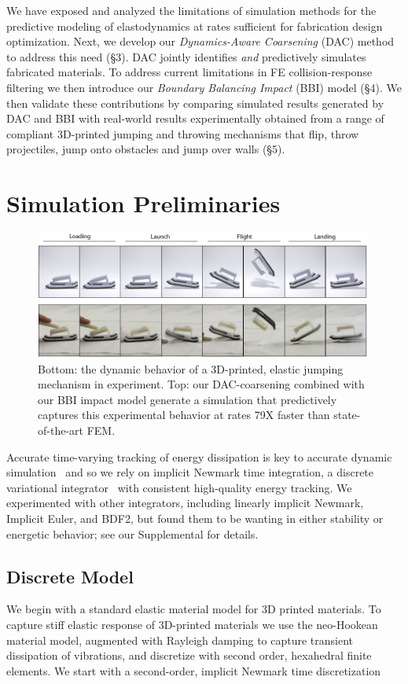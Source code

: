 We have exposed and analyzed the limitations of simulation methods for the predictive modeling of elastodynamics at rates sufficient for fabrication design optimization. Next, we develop our \emph{Dynamics-Aware Coarsening} (DAC) method to address this need {(\S3)}. DAC jointly identifies \emph{and} predictively simulates fabricated materials. To address current limitations in FE collision-response filtering we then introduce our \emph{Boundary Balancing Impact} (BBI) model {(\S4)}. 
We then validate these contributions by comparing simulated results generated by DAC and BBI with real-world results experimentally obtained from a range of compliant 3D-printed jumping and throwing mechanisms that flip, throw projectiles, jump onto obstacles and jump over walls (\S5).
\section{Simulation Preliminaries}
\begin{figure}
	\centering
	\includegraphics[width=0.99\textwidth]{images/dynPhase.png}
	\caption{Bottom: the dynamic behavior of a 3D-printed, elastic jumping mechanism in experiment. Top: our DAC-coarsening combined with our BBI impact model generate a simulation that predictively captures this experimental behavior at rates 79X faster than state-of-the-art FEM.}
	\label{fig:simulationStage}
\end{figure}
\label{sec:simPrelim}
Accurate time-varying tracking of energy dissipation is key to accurate dynamic simulation~\cite{Marsden:2001dj} and so we rely on implicit Newmark time integration, a discrete variational integrator~\cite{Kane:2000dw} with consistent high-quality energy tracking. 
We experimented with other integrators, including linearly implicit Newmark, Implicit Euler, and BDF2, but found them to be wanting in either stability or energetic behavior; see our Supplemental for details.
\subsection{Discrete Model} We begin with a standard elastic material model for 3D printed materials.
To capture stiff elastic response of 3D-printed materials we use the neo-Hookean material model, augmented with Rayleigh damping to capture transient dissipation of vibrations, and discretize with second order, hexahedral finite elements. We start with a second-order, implicit Newmark %
time discretization 

